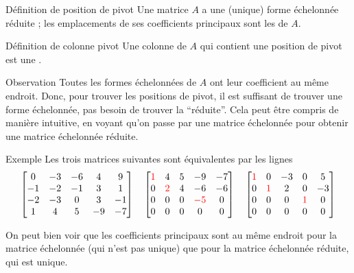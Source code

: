 \documentclass{article}
\begin{document}
\begin{parag}{Définition de position de pivot}
    Une matrice $A$ a une (unique) forme échelonnée réduite ; les emplacements de ses coefficients principaux sont les  de $A$.
\end{parag}

\begin{parag}{Définition de colonne pivot}
    Une colonne de $A$ qui contient une position de pivot est une .
\end{parag}

\begin{parag}{Observation}
    Toutes les formes échelonnées de $A$ ont leur coefficient au même endroit. Donc, pour trouver les positions de pivot, il est suffisant de trouver une forme échelonnée, pas besoin de trouver la ``réduite''. Cela peut être compris de manière intuitive, en voyant qu'on passe par une matrice échelonnée pour obtenir une matrice échelonnée réduite.
\end{parag}

\begin{parag}{Exemple}
    Les trois matrices suivantes sont équivalentes par les lignes
    \[\begin{bmatrix} 0 & -3 & -6 & 4 & 9 \\ -1 & -2 & -1 & 3 & 1 \\ -2 & -3 & 0 & 3 & -1 \\ 1 & 4 & 5 & -9 & -7 \end{bmatrix} \quad \begin{bmatrix} \color{red}{1} & 4 & 5 & -9 & -7 \\ 0 & \color{red}{2} & 4 & -6 & -6 \\ 0 & 0 & 0 & \color{red}{-5} & 0 \\ 0 & 0 & 0 & 0 & 0 \end{bmatrix} \quad \begin{bmatrix}\color{red}{1} & 0 & -3 & 0 & 5 \\ 0 & \color{red}{1} & 2 & 0 & -3 \\ 0 & 0 & 0 & \color{red}{1} & 0 \\ 0 & 0 & 0 & 0 & 0 \end{bmatrix}\]

    On peut bien voir que les coefficients principaux sont au même endroit pour la matrice échelonnée (qui n'est pas unique) que pour la matrice échelonnée réduite, qui est unique.
\end{parag}
\end{document}

